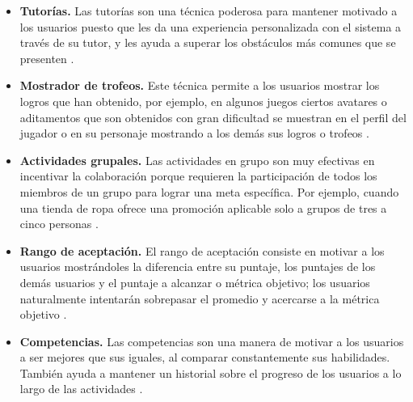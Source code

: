     \begin{itemize}

    \item
    {\bf Tutorías.}
        Las tutorías son una técnica poderosa para mantener motivado a los usuarios
        puesto que les da una experiencia personalizada con el sistema a través de su
        tutor, y les ayuda a superar los obstáculos más comunes que se presenten
        \cite[p. 215]{Octalysis}.

    \item
    {\bf Mostrador de trofeos.}
        Este técnica permite a los usuarios mostrar los logros que han obtenido,
        por ejemplo, en algunos juegos ciertos avatares o aditamentos que son
        obtenidos con gran dificultad se muestran en el perfil del jugador o en
        su personaje mostrando a los demás sus logros o trofeos
        \cite[p. 218]{Octalysis}.

    \item
    {\bf Actividades grupales.}
        Las actividades en grupo son muy efectivas en incentivar la colaboración
        porque requieren la participación de todos los miembros de un grupo para
        lograr una meta específica. Por ejemplo, cuando una tienda de ropa ofrece
        una promoción aplicable solo a grupos de tres a cinco personas
        \cite[p. 221]{Octalysis}.

    \item
    {\bf Rango de aceptación.}
        El rango de aceptación consiste en motivar a los usuarios mostrándoles
        la diferencia entre su puntaje, los puntajes de los demás usuarios
        y el puntaje a alcanzar o métrica objetivo; los usuarios naturalmente
        intentarán sobrepasar el promedio y acercarse a la métrica objetivo
        \cite[p. 226]{Octalysis}.

    \item
    {\bf Competencias.}
        Las competencias son una manera de motivar a los usuarios a ser mejores
        que sus iguales, al comparar constantemente sus habilidades. También ayuda
        a mantener un historial sobre el progreso de los usuarios a lo largo de las
        actividades \cite[p. 210]{Octalysis}.


    \end{itemize}

